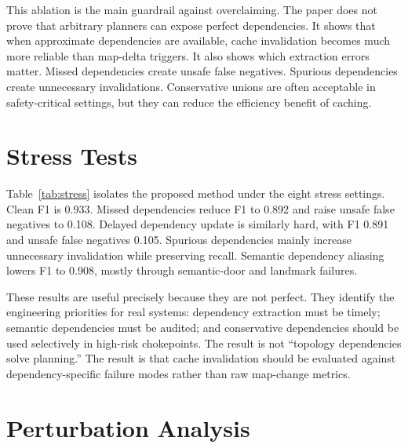 \documentclass{article}
\begin{document}
This ablation is the main guardrail against overclaiming. The paper does not prove that arbitrary planners can expose perfect dependencies. It shows that when approximate dependencies are available, cache invalidation becomes much more reliable than map-delta triggers. It also shows which extraction errors matter. Missed dependencies create unsafe false negatives. Spurious dependencies create unnecessary invalidations. Conservative unions are often acceptable in safety-critical settings, but they can reduce the efficiency benefit of caching.

\section{Stress Tests}

\begin{table}[t]
\centering
\resizebox{0.84\linewidth}{!}{}
\caption{Stress tests for the proposed plan-topology dependency policy. Delayed dependency updates and missed dependencies are the hardest stresses.}
\label{tab:stress}
\end{table}

Table~\ref{tab:stress} isolates the proposed method under the eight stress settings. Clean F1 is 0.933. Missed dependencies reduce F1 to 0.892 and raise unsafe false negatives to 0.108. Delayed dependency update is similarly hard, with F1 0.891 and unsafe false negatives 0.105. Spurious dependencies mainly increase unnecessary invalidation while preserving recall. Semantic dependency aliasing lowers F1 to 0.908, mostly through semantic-door and landmark failures.

These results are useful precisely because they are not perfect. They identify the engineering priorities for real systems: dependency extraction must be timely; semantic dependencies must be audited; and conservative dependencies should be used selectively in high-risk chokepoints. The result is not ``topology dependencies solve planning.'' The result is that cache invalidation should be evaluated against dependency-specific failure modes rather than raw map-change metrics.

\section{Perturbation Analysis}

\begin{table}[t]
\centering
\resizebox{\linewidth}{!}{}
\caption{Proposed-method results by perturbation family. Low F1 on cosmetic and off-plan clutter reflects low positive prevalence and false-alarm sensitivity; unsafe false negatives remain low there.}
\label{tab:perturb}
\end{table}
\end{document}
